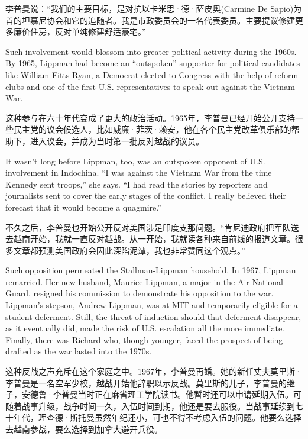 \ifdefined\chs
李普曼说：``我们的主要目标，是对抗以卡米思·德·萨皮奥(Carmine De Sapio)为首的坦慕尼协会和它的追随者。我是市政委员会的一名代表委员。主要提议修建更多廉价住房，反对单纯修建舒适豪宅。''
\fi

\ifdefined\eng
Such involvement would blossom into greater political activity during the 1960s. By 1965, Lippman had become an ``outspoken'' supporter for political candidates like William Fitts Ryan, a Democrat elected to Congress with the help of reform clubs and one of the first U.S. representatives to speak out against the Vietnam War.
\fi

\ifdefined\chs
这种参与在六十年代变成了更大的政治活动。1965年，李普曼已经开始公开支持一些民主党的议会候选人，比如威廉·菲茨·赖安，他在各个民主党改革俱乐部的帮助下，进入议会，并成为当时第一批反对越战的议员。
\fi

\ifdefined\eng
It wasn't long before Lippman, too, was an outspoken opponent of U.S. involvement in Indochina. ``I was against the Vietnam War from the time Kennedy sent troops,'' she says. ``I had read the stories by reporters and journalists sent to cover the early stages of the conflict. I really believed their forecast that it would become a quagmire.''
\fi

\ifdefined\chs
不久之后，李普曼也开始公开反对美国涉足印度支那问题。``肯尼迪政府把军队送去越南开始，我就一直反对越战。从一开始，我就读各种来自前线的报道文章。很多文章都预测美国政府会因此深陷泥潭，我也非常赞同这个观点。''
\fi

\ifdefined\eng
Such opposition permeated the Stallman-Lippman household. In 1967, Lippman remarried. Her new husband, Maurice Lippman, a major in the Air National Guard, resigned his commission to demonstrate his opposition to the war. Lippman's stepson, Andrew Lippman, was at MIT and temporarily eligible for a student deferment. Still, the threat of induction should that deferment disappear, as it eventually did, made the risk of U.S. escalation all the more immediate. Finally, there was Richard who, though younger, faced the prospect of being drafted as the war lasted into the 1970s.
\fi

\ifdefined\chs
这种反战之声充斥在这个家庭之中。1967年，李普曼再婚。她的新任丈夫莫里斯·李普曼是一名空军少校，越战开始他辞职以示反战。莫里斯的儿子，李普曼的继子，安德鲁·李普曼当时正在麻省理工学院读书。他暂时还可以申请延期入伍。可随着战事升级，战争时间一久，入伍时间到期，他还是要去服役。当战事延续到七十年代，理查德·斯托曼虽然年纪还小，可也不得不考虑入伍的问题。他要么选择去越南参战，要么选择到加拿大避开兵役。
\fi

